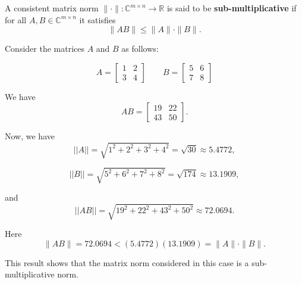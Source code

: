 \begin{definition}
A consistent matrix norm $\|\cdot\| : \mathbb{C}^{m\times n} \to \mathbb{R} $ is said to be\textbf{ sub-multiplicative } if for all $A,B\in \mathbb{C}^{m\times n}$ it satisfies $$\| AB \| \leq \| A \|\cdot\| B \|.$$  
\end{definition}

\begin{example}
Consider the matrices $A$ and $B$ as follows:

  \[ A = \begin{bmatrix} 1 & 2 \\ 3 & 4 \end{bmatrix} 
  \quad\quad
  B = \begin{bmatrix} 5 & 6 \\ 7 & 8 \end{bmatrix} \]
  
We have
\[ AB = \begin{bmatrix} 19 & 22 \\ 43 & 50 \end{bmatrix}. \]

Now, we have
\[ ||A|| = \sqrt{1^2 + 2^2 + 3^2 + 4^2} = \sqrt{30} \approx 5.4772, \]

\[ ||B|| = \sqrt{5^2 + 6^2 + 7^2 + 8^2} = \sqrt{174} \approx 13.1909, \]

and
\[ ||AB|| = \sqrt{19^2 + 22^2 + 43^2 + 50^2} \approx 72.0694. \]
  
Here
\[ \|AB\| = 72.0694 < (5.4772)(13.1909) = \|A\| \cdot \|B\|. \]

This result shows that the matrix norm considered in this case is a sub-multiplicative norm.

 \end{example}





















